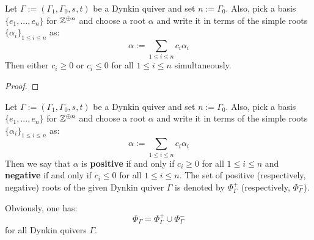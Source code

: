             \begin{lemma} \label{lemma: roots_are_exclusively_either_negative_or_positive}
                Let $\Gamma := (\Gamma_1, \Gamma_0, s, t)$ be a Dynkin quiver and set $n := \Gamma_0$. Also, pick a basis $\{e_1, ..., e_n\}$ for $\mathbb{Z}^{\oplus n}$ and choose a root $\alpha$ and write it in terms of the simple roots $\{\alpha_i\}_{1 \leq i \leq n}$ as:
                    $$\alpha := \sum_{1 \leq i \leq n} c_i \alpha_i$$
                Then either $c_i \geq 0$ or $c_i \leq 0$ for all $1 \leq i \leq n$ simultaneously.
            \end{lemma}
                \begin{proof}
                    
                \end{proof}
            \begin{definition} \label{def: negative_and_positive_roots}
                Let $\Gamma := (\Gamma_1, \Gamma_0, s, t)$ be a Dynkin quiver and set $n := \Gamma_0$. Also, pick a basis $\{e_1, ..., e_n\}$ for $\mathbb{Z}^{\oplus n}$ and choose a root $\alpha$ and write it in terms of the simple roots $\{\alpha_i\}_{1 \leq i \leq n}$ as:
                    $$\alpha := \sum_{1 \leq i \leq n} c_i \alpha_i$$
                Then we say that $\alpha$ is \textbf{positive} if and only if $c_i \geq 0$ for all $1 \leq i \leq n$ and \textbf{negative} if and only if $c_i \leq 0$ for all $1 \leq i \leq n$. The set of positive (respectively, negative) roots of the given Dynkin quiver $\Gamma$ is denoted by $\Phi_{\Gamma}^+$ (respectively, $\Phi_{\Gamma}^-$).
            \end{definition}
            \begin{remark}
                Obviously, one has:
                    $$\Phi_{\Gamma} = \Phi_{\Gamma}^+ \cup \Phi_{\Gamma}^-$$
                for all Dynkin quivers $\Gamma$.
            \end{remark}
            
